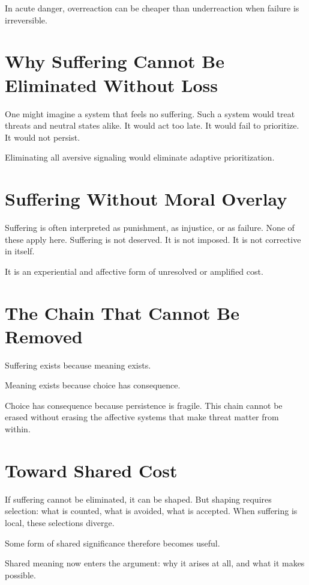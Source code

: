 \documentclass[11pt,twoside,openright]{book}
\begin{document}
In acute danger, overreaction can be cheaper than underreaction when failure is irreversible.

\section*{Why Suffering Cannot Be Eliminated Without Loss}

One might imagine a system that feels no suffering. Such a system would treat threats and neutral states alike. It would act too late. It would fail to prioritize. It would not persist.

Eliminating all aversive signaling would eliminate adaptive prioritization.

\section*{Suffering Without Moral Overlay}

Suffering is often interpreted as punishment, as injustice, or as failure. None of these apply here. Suffering is not deserved. It is not imposed. It is not corrective in itself.

It is an experiential and affective form of unresolved or amplified cost.

\section*{The Chain That Cannot Be Removed}

Suffering exists because meaning exists.

Meaning exists because choice has consequence.

Choice has consequence because persistence is fragile. This chain cannot be erased without erasing the affective systems that make threat matter from within.

\section*{Toward Shared Cost}

If suffering cannot be eliminated, it can be shaped. But shaping requires selection: what is counted, what is avoided, what is accepted. When suffering is local, these selections diverge.

Some form of shared significance therefore becomes useful.

Shared meaning now enters the argument: why it arises at all, and what it makes possible.
\end{document}
